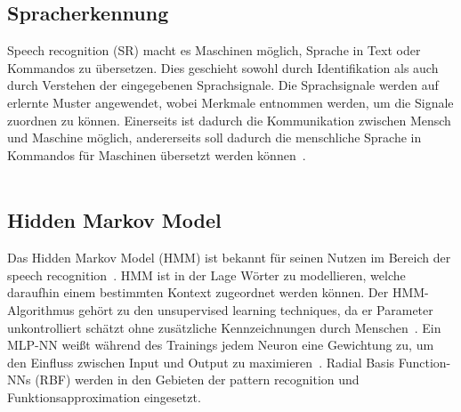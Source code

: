 \subsection{Spracherkennung}
Speech recognition (SR) macht es Maschinen möglich, Sprache in Text oder Kommandos zu übersetzen. Dies geschieht sowohl durch Identifikation als auch durch Verstehen der eingegebenen Sprachsignale. Die Sprachsignale werden auf erlernte Muster angewendet, wobei Merkmale entnommen werden, um die Signale zuordnen zu können. Einerseits ist dadurch die Kommunikation zwischen Mensch und Maschine möglich, andererseits soll dadurch die menschliche Sprache in Kommandos für Maschinen übersetzt werden können~\cite{technology}.\\
\\
\subsection*{Hidden Markov Model}
Das Hidden Markov Model (HMM) ist bekannt für seinen Nutzen im Be\-reich der speech recognition~\cite{residualnn}. HMM ist in der Lage Wörter zu modellieren, welche daraufhin einem bestimmten Kontext zugeordnet werden können. Der HMM-Algorithmus gehört zu den unsupervised learning techniques, da er Parameter unkontrolliert schätzt ohne zusätzliche Kennzeichnungen durch Menschen~\cite{hmm}. Ein MLP-NN weißt während des Trainings jedem Neuron eine Gewichtung zu, um den Einfluss zwischen Input und Output zu ma\-ximieren~\cite{Khalifelu2012}. Radial Basis Function-NNs (RBF) werden in den Gebieten der pattern recognition und Funktionsapproximation eingesetzt. 

